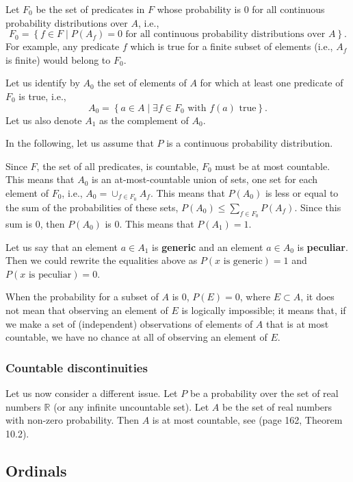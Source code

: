 \documentclass[a4paper
,draft
]{article}
\def\reale{\mathbb{R}}
\newcommand{\multime}[1]{\left\{ #1 \right\}}
\newcommand{\definitie}[1]{\textbf{#1}}
\begin{document}
Let $F_0$ be the set of predicates in $F$ whose probability is
$0$ for all continuous probability distributions over $A$, i.e.,
$$F_0=\multime{
  f\in F
  \mid P(A_f)=0
    \mbox{ for all continuous probability distributions over } A}.
$$
For example, any predicate $f$ which is true for a finite subset of elements
(i.e., $A_f$ is finite) would belong to $F_0$.

Let us identify by $A_0$ the
set of elements of $A$ for which at least one predicate of $F_0$ is true, i.e.,
$$A_0=\multime{a \in A\mid \exists f\in F_0 \mbox{ with } f(a)\mbox{ true} }.$$
Let us also denote $A_1$ as the complement of $A_0$.

In the following, let us assume that $P$ is a continuous probability distribution.

Since $F$, the set of all predicates, is countable, $F_0$ must be at most
countable.
This means that $A_0$ is an at-most-countable union of sets, one set for each
element of $F_0$, i.e., $A_0=\cup_{f\in F_0} A_f$.
This means that $P(A_0)$ is less or equal to the sum of the probabilities of
these sets, $P(A_0)\le\sum_{f\in F_0} P(A_f)$.
Since this sum is $0$, then $P(A_0)$ is $0$.
This means that $P(A_1)=1$.

Let us say that an element $a\in A_1$ is \definitie{generic}
and an element $a\in A_0$ is \definitie{peculiar}. Then we could rewrite
the equalities above as $P(x\mbox{ is generic}) = 1$ and
$P(x\mbox{ is peculiar}) = 0$.

When the probability for a subset of $A$ is $0$, $P(E)=0$, where $E\subset A$,
it does not mean that observing an element of $E$ is logically impossible;
it means that,
if we make a set of (independent) observations of elements of $A$
that is at most countable, we have no chance at all of observing an element of
$E$.

\subsubsection{Countable discontinuities}

Let us now consider a different issue.
Let $P$ be a probability over the set of real numbers $\reale$ (or
any infinite uncountable set).
Let $A$ be the set of real numbers with non-zero probability.
Then $A$ is at most countable, see \textcite{Billingsley1995} (page 162, Theorem 10.2).

\subsection{Ordinals}
\label{sec:ordinals}
\end{document}
